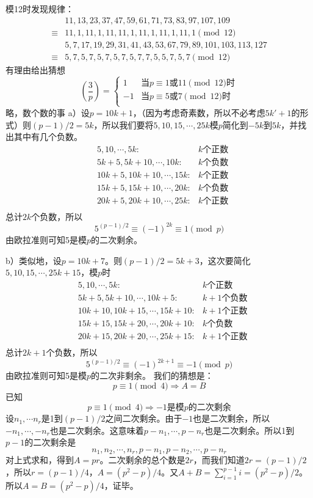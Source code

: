 %
\exercise 模12时发现规律：
\begin{align*}
&11, 13, 23, 37, 47, 59, 61, 71, 73, 83, 97, 107, 109\\
\equiv&11, 1, 11, 1, 11, 11, 1, 11, 1, 11, 1, 11, 1\pmod{12}\\
&5, 7, 17, 19, 29, 31, 41, 43, 53, 67, 79, 89, 101, 103, 113, 127\\
\equiv & 5, 7, 5, 7, 5, 7, 5, 7, 5, 7, 7, 5, 5, 7, 5, 7\pmod{12}
\end{align*}
有理由给出猜想
\[\left(\frac{3}{p}\right)=
\begin{cases}
    1&\text{当$p\equiv1$或$11\pmod{12}$时}\\
    -1&\text{当$p\equiv5$或$7\pmod{12}$时}\\
\end{cases}\]
%
\exercise 略，数个数的事
%
\exercise a）设$p=10k+1$，（因为考虑奇素数，所以不必考虑$5k'+1$的形式）则$(p-1)/2=5k$，所以我们要将$5,10,15,\cdots,25k$模$p$简化到$-5k$到$5k$，并找出其中有几个负数。
\begin{align*}
&5,10,\cdots,5k: & k\text{个正数} \\
&5k+5,5k+10,\cdots,10k: & k\text{个负数} \\
&10k+5,10k+10,\cdots,15k: & k\text{个正数} \\
&15k+5,15k+10,\cdots,20k: & k\text{个负数} \\
&20k+5,20k+10,\cdots,25k: & k\text{个正数} \\
\end{align*}
总计$2k$个负数，所以
\[5^{(p-1)/2}\equiv(-1)^{2k}\equiv1\pmod p\]
由欧拉准则可知5是模$p$的二次剩余。\par
b）类似地，设$p=10k+7$。则$(p-1)/2=5k+3$，这次要简化$5,10,15,\cdots,25k+15$，模$p$时
\begin{align*}
&5,10,\cdots,5k: & k\text{个正数} \\
&5k+5,5k+10,\cdots,10k+5: & k+1\text{个负数} \\
&10k+10,10k+15,\cdots,15k+10: & k+1\text{个正数} \\
&15k+15,15k+20,\cdots,20k+10: & k\text{个负数} \\
&20k+15,20k+20,\cdots,25k+15: & k+1\text{个正数} \\
\end{align*}
总计$2k+1$个负数，所以
\[5^{(p-1)/2}\equiv(-1)^{2k+1}\equiv-1\pmod p\]
由欧拉准则可知5是模$p$的二次非剩余。
%
\exercise 我们的猜想是：
\[p\equiv1\pmod4\Longrightarrow A=B\]
\proof 已知
\[p\equiv1\pmod4\Longrightarrow -1\text{是模$p$的二次剩余}\]
设$n_1,\cdots n_r$是1到$(p-1)/2$之间二次剩余。由于$-1$也是二次剩余，所以$-n_1,\cdots,-n_r$也是二次剩余。这意味着$p-n_1,\cdots,p-n_r$也是二次剩余。所以1到$p-1$的二次剩余是
\[n_1,n_2,\cdots,n_r,p-n_1,p-n_2,\cdots,p-n_r\]
对上式求和，得到$A=pr$。二次剩余的总个数是$2r$，而我们知道$2r=(p-1)/2$，所以$r=(p-1)/4$，$A=(p^2-p)/4$。又$A+B=\sum_{i=1}^{p-1}i=(p^2-p)/2$。所以$A=B=(p^2-p)/4$，证毕。